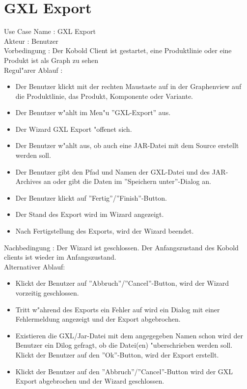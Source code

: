 \section{GXL Export}

Use Case Name      : GXL Export\\
Akteur             : Benutzer\\
Vorbedingung       : Der Kobold Client ist gestartet, eine Produktlinie oder eine Produkt ist als Graph zu sehen\\
Regul"arer Ablauf   : \\
\begin {itemize}
\item Der Benutzer klickt mit der rechten Maustaste auf in der Graphenview auf die Produktlinie, das Produkt, Komponente oder Variante.
\item Der Benutzer w"ahlt im Men"u ''GXL-Export'' aus.
\item Der Wizard GXL Export "offenet sich.
\item Der Benutzer w"ahlt aus, ob auch eine JAR-Datei mit dem Source erstellt werden soll.
\item Der Benutzer gibt den Pfad und Namen der GXL-Datei und des JAR-Archives an oder gibt die Daten im ''Speichern unter''-Dialog an.
\item Der Benutzer klickt auf ''Fertig''/''Finish''-Button.
\item Der Stand des Export wird im Wizard angezeigt.
\item Nach Fertigstellung des Exports, wird der Wizard beendet.
\end{itemize}
Nachbedingung      : Der Wizard ist geschlossen. Der Anfangszustand des Kobold clients ist wieder im Anfangszustand.\\
Alternativer Ablauf:\\
\begin{itemize}
\item Klickt der Benutzer auf ''Abbruch''/''Cancel''-Button, wird der Wizard vorzeitig geschlossen.\\
\item Tritt w"ahrend des Exports ein Fehler auf wird ein Dialog mit einer Fehlermeldung angezeigt und der Export abgebrochen.\\
\item Existieren die GXL/Jar-Datei mit dem angegegeben Namen schon wird der Benutzer ein Dilog gefragt, ob die Datei(en) "uberschrieben werden soll. Klickt der Benutzer auf den ''Ok''-Button, wird der Export erstellt.
\item Klickt der Benutzer auf den ''Abbruch''/''Cancel''-Button wird der GXL Export abgebrochen und der Wizard geschlossen.\\
\end{itemize} \par

